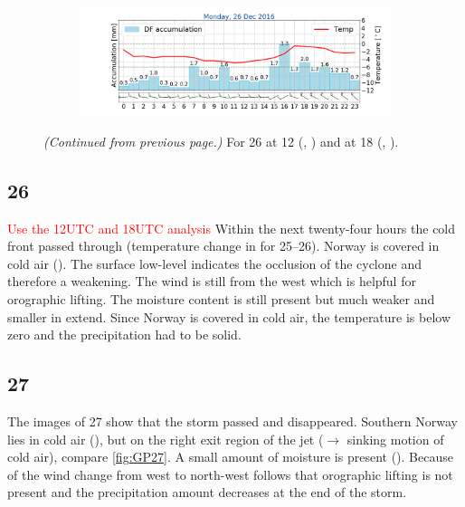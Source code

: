 \begin{figure}
\begin{subfigure}[b]{0.49\textwidth}
		\includegraphics[trim={4.9cm 1.cm 1.5cm 1cm},clip,
		width=\textwidth]{./fig_weathermast/T_P_U_20161226}
		\caption{} \label{fig:TPU26}
	\end{subfigure}
\caption{\textit{(Continued from previous page.)} For \SI{26}{\dec} at \SI{12}{\UTC} (\protect{}, \protect{}) and at \SI{18}{\UTC} (\protect{}, \protect{}).}
\end{figure}
\subsection*{\SI{26}{\dec}}
\textcolor{red}{Use the 12UTC and 18UTC analysis}
\noindent Within the next twenty-four hours the cold front passed through (temperature change in  for \SIrange{25}{26}{\dec}). Norway is covered in cold air (). The surface low-level indicates the occlusion of the cyclone and therefore a weakening. The wind is still from the west which is helpful for orographic lifting. The moisture content is still present but much weaker and smaller in extend. Since Norway is covered in cold air, the temperature is below zero and the precipitation had to be solid. 

\subsection*{\SI{27}{\dec}}
\noindent
The images of \SI{27}{\dec} show that the storm passed and disappeared. Southern Norway lies in cold air (), but on the right exit region of the jet ($\rightarrow$ sinking motion of cold air), compare \ref{fig:GP27}. A small amount of moisture is present (). Because of the wind change from west to north-west follows that orographic lifting is not present and the precipitation amount decreases at the end of the storm. 



